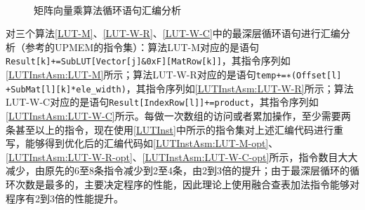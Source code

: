 \begin{figure}[htbp!]
	\centering
    \\
	\label{LUTInstAsm}
	\caption{矩阵向量乘算法循环语句汇编分析}
\end{figure}

对三个算法\ref{LUT-M}、\ref{LUT-W-R}、\ref{LUT-W-C}中的最深层循环语句进行汇编分析（参考的UPMEM的指令集）：算法LUT-M对应的是语句\verb|Result[k]+=SubLUT[Vector[j]&0xF][MatRow[k]]|，其指令序列如\ref{LUTInstAsm:LUT-M}所示；算法LUT-W-R对应的是语句\verb|temp+=∗(Offset[l] +SubMat[l][k]*ele_width)|，其指令序列如\ref{LUTInstAsm:LUT-W-R}所示；算法LUT-W-C对应的是语句\verb|Result[IndexRow[l]]+=product|，其指令序列如\ref{LUTInstAsm:LUT-W-C}所示。每做一次数组的访问或者累加操作，至少需要两条甚至以上的指令，现在使用\ref{LUTInst}中所示的指令集对上述汇编代码进行重写，能够得到优化后的汇编代码如\ref{LUTInstAsm:LUT-M-opt}、\ref{LUTInstAsm:LUT-W-R-opt}、\ref{LUTInstAsm:LUT-W-C-opt}所示，指令数目大大减少，由原先的6至8条指令减少到2至4条，由2到3倍的提升；由于最深层循环的循环次数是最多的，主要决定程序的性能，因此理论上使用融合查表加法指令能够对程序有2到3倍的性能提升。

